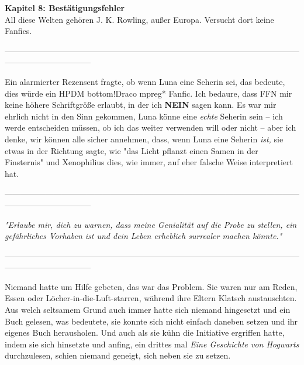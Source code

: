 

\hypertarget{bestuxe4tigungsfehler}{%

\textbf{Kapitel 8: Bestätigungsfehler}\\

All diese Welten gehören J. K. Rowling, außer Europa. Versucht dort keine Fanfics.

--------------------------------------------------------------------------------------------------------------------------------------------

Ein alarmierter Rezensent fragte, ob wenn Luna eine Seherin sei, das bedeute, dies würde ein HPDM bottom!Draco mpreg* Fanfic. Ich bedaure, dass FFN mir keine höhere Schriftgröße erlaubt, in der ich \textbf{NEIN} sagen kann. Es war mir ehrlich nicht in den Sinn gekommen, Luna könne eine \emph{echte} Seherin sein -- ich werde entscheiden müssen, ob ich das weiter verwenden will oder nicht -- aber ich denke, wir können alle sicher annehmen, dass, wenn Luna eine Seherin \emph{ist,} sie etwas in der Richtung sagte, wie "das Licht pflanzt einen Samen in der Finsternis" und Xenophilius dies, wie immer, auf eher falsche Weise interpretiert hat.

--------------------------------------------------------------------------------------------------------------------------------------------

\emph{"Erlaube mir, dich zu warnen, dass meine Genialität auf die Probe zu stellen, ein gefährliches Vorhaben ist und dein Leben erheblich surrealer machen könnte."}

--------------------------------------------------------------------------------------------------------------------------------------------

Niemand hatte um Hilfe gebeten, das war das Problem. Sie waren nur am Reden, Essen oder Löcher-in-die-Luft-starren, während ihre Eltern Klatsch austauschten. Aus welch seltsamem Grund auch immer hatte sich niemand hingesetzt und ein Buch gelesen, was bedeutete, sie konnte sich nicht einfach daneben setzen und ihr eigenes Buch herausholen. Und auch als sie kühn die Initiative ergriffen hatte, indem sie sich hinsetzte und anfing, ein drittes mal \emph{Eine Geschichte von Hogwarts} durchzulesen, schien niemand geneigt, sich neben sie zu setzen.

}
